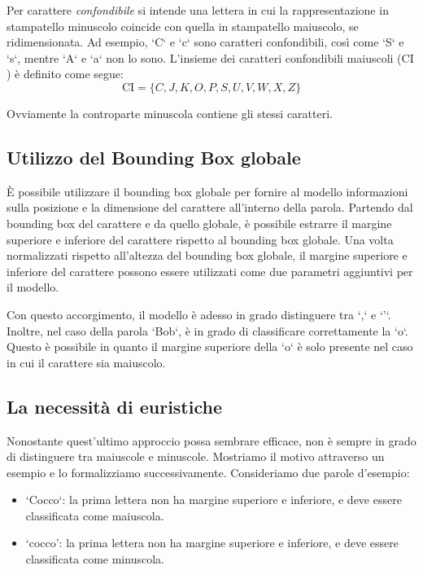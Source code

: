 Per carattere \emph{confondibile} si intende una lettera in cui la rappresentazione in stampatello minuscolo coincide con quella in stampatello maiuscolo, se ridimensionata. Ad esempio, `C` e `c` sono caratteri confondibili, così come `S` e `s`, mentre `A` e `a` non lo sono.
L'insieme dei caratteri confondibili maiuscoli ($\text{CI}$) è definito come segue:
$$\text{CI} = \{C, J, K, O, P, S, U, V, W, X, Z\}$$

Ovviamente la controparte minuscola contiene gli stessi caratteri.

\subsection{Utilizzo del Bounding Box globale}

È possibile utilizzare il bounding box globale per fornire al modello informazioni sulla posizione e la dimensione del carattere all'interno della parola. Partendo dal bounding box del carattere e da quello globale, è possibile estrarre il margine superiore e inferiore del carattere rispetto al bounding box globale. Una volta normalizzati rispetto all'altezza del bounding box globale, il margine superiore e inferiore del carattere possono essere utilizzati come due parametri aggiuntivi per il modello.

Con questo accorgimento, il modello è adesso in grado distinguere tra `,` e `'`. Inoltre, nel caso della parola `Bob`, è in grado di classificare correttamente la `o`. Questo è possibile in quanto il margine superiore della `o` è solo presente nel caso in cui il carattere sia maiuscolo.

\subsection{La necessità di euristiche}

Nonostante quest'ultimo approccio possa sembrare efficace, non è sempre in grado di distinguere tra maiuscole e minuscole.
Mostriamo il motivo attraverso un esempio e lo formalizziamo successivamente.
Consideriamo due parole d'esempio:
\begin{itemize}
	\item `Cocco`: la prima lettera non ha margine superiore e inferiore, e deve essere classificata come maiuscola.
	\item `cocco': la prima lettera non ha margine superiore e inferiore, e deve essere classificata come minuscola.
\end{itemize}

